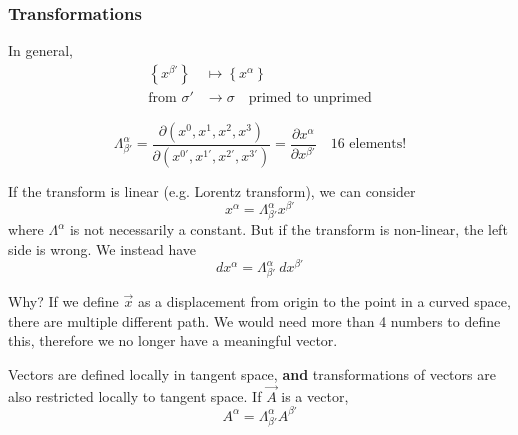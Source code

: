 \documentclass[a4paper]{article} %
\begin{document}
\subsubsection{Transformations}
In general,
\begin{align*}
\left\{x^{\beta'}\right\}&\mapsto \left\{x^{\alpha}\right\}\\
\text{from }\sigma' &\to \sigma\quad\text{primed to unprimed}
\end{align*}

\begin{equation}
\Lambda^{\alpha}_{\beta'}=\frac{\partial (x^{0},x^{1},x^{2},x^{3})}{\partial (x^{0'},x^{1'},x^{2'},x^{3'})}
=\frac{\partial x^{\alpha}}{\partial x^{\beta'}}\quad \text{16 elements!}
\end{equation}

If the transform is linear (e.g. Lorentz transform), we can consider
\begin{equation}
x^{\alpha}=\Lambda^{\alpha}_{\beta'}x^{\beta'}
\end{equation}
where $\Lambda^{\alpha}$ is not necessarily a constant. But if the transform is non-linear, the left side is wrong. We instead have
\begin{equation}
dx^{\alpha}=\Lambda^{\alpha}_{\beta'}~dx^{\beta'}
\end{equation}

Why? If we define $\vec{x}$ as a displacement from origin to the point in a curved space, there are multiple different path. We would need more than 4 numbers to define this, therefore we no longer have a meaningful vector. 

Vectors are defined locally in tangent space, \textbf{and} transformations of vectors are also restricted locally to tangent space. If $\vec{A}$ is a vector,
\begin{equation}
A^{\alpha}=\Lambda^{\alpha}_{\beta'}A^{\beta'}
\end{equation}
\end{document}
